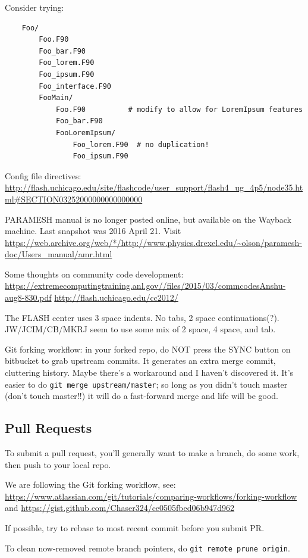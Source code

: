 \documentclass[10pt]{article}
\begin{document}
Consider trying:
\begin{verbatim}
    Foo/
        Foo.F90
        Foo_bar.F90
        Foo_lorem.F90
        Foo_ipsum.F90
        Foo_interface.F90
        FooMain/
            Foo.F90          # modify to allow for LoremIpsum features
            Foo_bar.F90
            FooLoremIpsum/
                Foo_lorem.F90  # no duplication!
                Foo_ipsum.F90
\end{verbatim}


Config file directives:
\url{http://flash.uchicago.edu/site/flashcode/user_support/flash4_ug_4p5/node35.html#SECTION03252000000000000000}

PARAMESH manual is no longer posted online, but available on the Wayback
machine.  Last snapshot was 2016 April 21.
Visit
\url{https://web.archive.org/web/*/http://www.physics.drexel.edu/~olson/paramesh-doc/Users_manual/amr.html}

Some thoughts on community code development:
\url{https://extremecomputingtraining.anl.gov//files/2015/03/commcodesAnshu-aug8-830.pdf}
\url{http://flash.uchicago.edu/cc2012/}

The FLASH center uses 3 space indents.  No tabs, 2 space continuations(?).
JW/JCIM/CB/MKRJ seem to use some mix of 2 space, 4 space, and tab.

Git forking workflow: in your forked repo, do NOT press the SYNC button on
bitbucket to grab upstream commits.
It generates an extra merge commit, cluttering history.
Maybe there's a workaround and I haven't discovered it.
It's easier to do \texttt{git merge upstream/master};
so long as you didn't touch master (don't touch master!!) it will do a
fast-forward merge and life will be good.


\subsection{Pull Requests}

To submit a pull request, you'll generally want to make a branch, do some work,
then push to your local repo.

We are following the Git forking workflow, see:
\url{https://www.atlassian.com/git/tutorials/comparing-workflows/forking-workflow}
and
\url{https://gist.github.com/Chaser324/ce0505fbed06b947d962}

If possible, try to rebase to most recent commit before you submit PR.

To clean now-removed remote branch pointers, do \texttt{git remote prune origin}.
\end{document}
